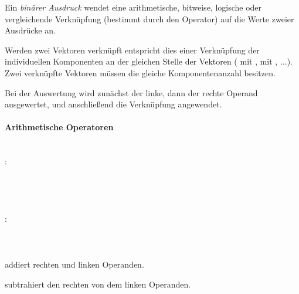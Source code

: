 Ein \emph{binärer Ausdruck} wendet eine arithmetische, bitweise, logische oder vergleichende Verknüpfung
(bestimmt durch den Operator) auf die Werte zweier Ausdrücke an.

Werden zwei Vektoren verknüpft entspricht dies einer Verknüpfung der individuellen Komponenten an der gleichen
Stelle der Vektoren ( mit ,  mit , $\dots$). Zwei verknüpfte Vektoren müssen
die gleiche Komponentenanzahl besitzen.

Bei der Auswertung wird zunächst der linke, dann der rechte Operand ausgewertet, und an\-schließend die Verknüpfung angewendet.

\paragraph{Arithmetische Operatoren}\label{Arithmetische Operatoren}
~\\
:\label{asdr_mult}\\
\hspace*{1cm} \\
\hspace*{1cm} \glq\Gt{*}\grq  {} \\
\hspace*{1cm} \glq\Gt{/}\grq  {} \\
\hspace*{1cm} \glq\Gt{\%}\grq  {} \\
:\label{asdr_add}\\
\hspace*{1cm} \\
\hspace*{1cm} \glq\Gt{+}\grq  {} \\
\hspace*{1cm} \glq\Gt{-}\grq  {} \\

\op{\plus} addiert rechten und linken Operanden.

\op{-} subtrahiert den rechten von dem linken Operanden.


